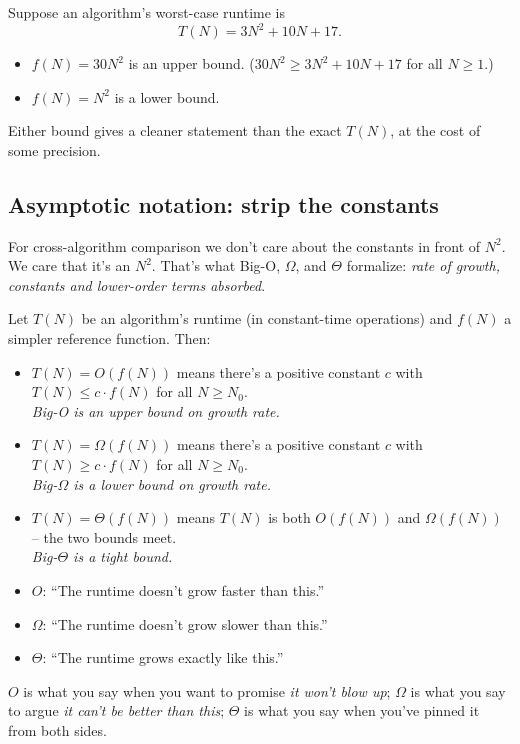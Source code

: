 \documentclass[11pt]{article}
\begin{document}
\begin{examplebox}
Suppose an algorithm's worst-case runtime is
\[
  T(N) = 3N^2 + 10N + 17.
\]
\begin{itemize}[leftmargin=*]
  \item $f(N) = 30 N^2$ is an upper bound. ($30 N^2 \ge 3N^2 + 10N + 17$
        for all $N \ge 1$.)
  \item $f(N) = N^2$ is a lower bound.
\end{itemize}
Either bound gives a cleaner statement than the exact $T(N)$, at the
cost of some precision.
\end{examplebox}

\subsection{Asymptotic notation: strip the constants}

For cross-algorithm comparison we don't care about the constants in
front of $N^2$. We care that it's an $N^2$. That's what Big-O,
$\Omega$, and $\Theta$ formalize: \emph{rate of growth, constants and
lower-order terms absorbed}.

\begin{defnbox}
Let $T(N)$ be an algorithm's runtime (in constant-time operations)
and $f(N)$ a simpler reference function. Then:
\begin{itemize}[leftmargin=*]
  \item $T(N) = O(f(N))$ means there's a positive constant $c$ with
        $T(N) \le c \cdot f(N)$ for all $N \ge N_0$. \\
        \emph{Big-O is an upper bound on growth rate.}
  \item $T(N) = \Omega(f(N))$ means there's a positive constant $c$
        with $T(N) \ge c \cdot f(N)$ for all $N \ge N_0$. \\
        \emph{Big-$\Omega$ is a lower bound on growth rate.}
  \item $T(N) = \Theta(f(N))$ means $T(N)$ is both $O(f(N))$ and
        $\Omega(f(N))$ -- the two bounds meet. \\
        \emph{Big-$\Theta$ is a tight bound.}
\end{itemize}
\end{defnbox}

\begin{ideabox}
\begin{itemize}[leftmargin=*]
  \item \textbf{$O$}: ``The runtime doesn't grow faster than this.''
  \item \textbf{$\Omega$}: ``The runtime doesn't grow slower than this.''
  \item \textbf{$\Theta$}: ``The runtime grows exactly like this.''
\end{itemize}
$O$ is what you say when you want to promise \emph{it won't blow up};
$\Omega$ is what you say to argue \emph{it can't be better than this};
$\Theta$ is what you say when you've pinned it from both sides.
\end{ideabox}
\end{document}
